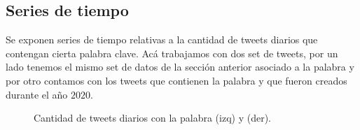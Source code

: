 \documentclass{article}
\begin{document}
\subsection{Series de tiempo}
Se exponen series de tiempo relativas a la cantidad de tweets diarios que contengan cierta palabra clave. Acá trabajamos con dos set de tweets, por un lado tenemos el mismo set de datos de la sección anterior asociado a la palabra  y por otro contamos con los tweets que contienen la palabra  y que fueron creados durante el año $2020$.
\begin{figure}[H]
	\centering
	\caption{Cantidad de tweets diarios con la palabra  (izq) y  (der).}
\end{figure}
\end{document}
